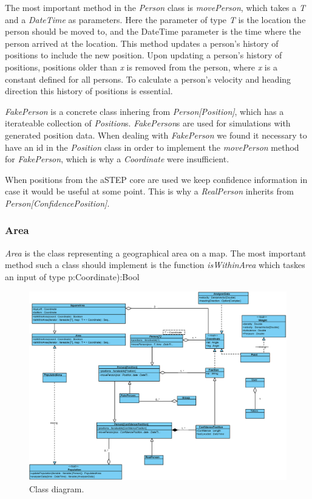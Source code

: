 The most important method in the \emph{Person} class is \emph{movePerson}, which takes a \emph{T} and a \emph{DateTime} as parameters. Here the parameter of type \emph{T} is the location the person should be moved to, and the DateTime parameter is the time where the person arrived at the location. This method updates a person's history of positions to include the new position. Upon updating a person's history of positions, positions older than \emph{x} is removed from the person, where \emph{x} is a constant defined for all persons. To calculate a person's velocity and heading direction this history of positions is essential.

\emph{FakePerson} is a concrete class inhering from \emph{Person[Position]}, which has a iterateable collection of \emph{Position}s. \emph{FakePerson}s are used for simulations with generated position data. When dealing with \emph{FakePerson} we found it necessary to have an id in the \emph{Position} class in order to implement the \emph{movePerson} method for \emph{FakePerson}, which is why a \emph{Coordinate} were insufficient. 

When positions from the aSTEP core are used we keep confidence information in case it would be useful at some point. This is why a \emph{RealPerson} inherits from \emph{Person[ConfidencePosition]}.

\subsubsection{Area}

\emph{Area} is the class representing a geographical area on a map. The most important method such a class should implement is the function \emph{isWithinArea} which taskes an input of type p:Coordinate):Bool

\begin{figure}
\centering
\includegraphics[width=\linewidth]{figures/class.eps}
\caption{Class diagram.}
\label{fig:class}
\end{figure}
